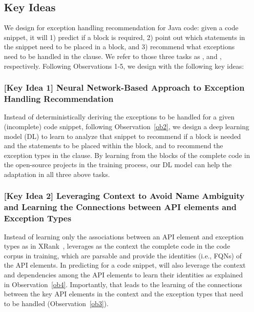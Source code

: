 \subsection{Key Ideas}
\label{key:sec}

We design {\tool} for exception handling recommendation for
Java code: given a code snippet, it will 1) predict if a
 block is required, 2) point out which statements in
the snippet need to be placed in a  block, and 3)
recommend what exceptions need to be handled in the 
clause. We refer to those three tasks as {\xblock}, {\xstate} and
{\xtype}, respectively. Following Observations 1-5, we design {\tool}
with the following key ideas:



\subsubsection{{\bf [Key Idea 1] Neural Network-Based Approach to Exception Handling Recommendation}}
Instead of deterministically deriving the exceptions to be handled for
a given (incomplete) code snippet, following Observation~\ref{ob2}, we
design a deep learning model (DL) to learn to analyze that snippet to
recommend if a  block is needed and the statements to
be placed within the  block, and to recommend the
exception types in the  clause.  By learning from the
 blocks of the complete code in the open-source
projects in the training process, our DL model can help the adaptation
in all three above tasks.




\vspace{2pt}
\subsubsection{{\bf [Key Idea 2] Leveraging Context to Avoid
Name Ambiguity and Learning the Connections between API elements and
Exception Types}} Instead of learning only the associations between an
API element and exception types as in XRank~\cite{xrank-fse20},
{\tool} leverages as the context the complete code in the code
corpus in training, which are parsable and provide the identities
(i.e., FQNs) of the API elements. In predicting for a code snippet,
{\tool} will also leverage the context and dependencies among the API
elements to learn their identities as explained in
Observation~\ref{ob4}. Importantly, that leads to the learning of the
connections between the key API elements in the context and the
exception types that need to be handled (Observation~\ref{ob3}).


